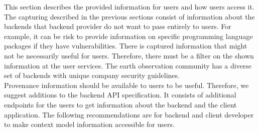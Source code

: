 \documentclass[draft,final]{vutinfth} %
\begin{document}
This section describes the provided information for users and how users access it. The capturing described in the previous sections consist of information about the backends that backend provider do not want to pass entirely to users. For example, it can be risk to provide information on specific programming language packages if they have vulnerabilities. There is captured information that might not be necessarily useful for users. Therefore, there must be a filter on the shown information at the user services. The earth observation community has a diverse set of backends with unique company security guidelines.\\ 
Provenance information should be available to users to be useful. Therefore, we suggest additions to the backend API specification. It consists of additional endpoints for the users to get information about the backend and the client application. The following recommendations are for backend and client developer to make context model information accessible for users.
\end{document}
